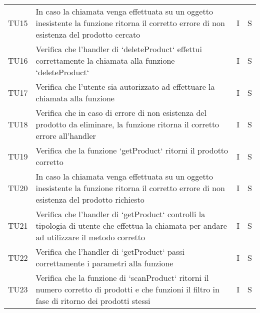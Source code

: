 \begin{center}
\begin{longtable}[!h]{p{45px} p{255px} p{35px} p{35px}}
        TU15          & In caso la chiamata venga effettuata su un oggetto inesistente la funzione ritorna il corretto errore di non esistenza del prodotto cercato                                                      & I              & S              \\
        TU16          & Verifica che l'handler di `deleteProduct` effettui correttamente la chiamata alla funzione `deleteProduct`                                                                                       & I              & S              \\
        TU17          & Verifica che l'utente sia autorizzato ad effettuare la chiamata alla funzione                                                                                                                    & I              & S              \\
        TU18          & Verifica che in caso di errore di non esistenza del prodotto da eliminare, la funzione ritorna il corretto errore all'handler                                                                    & I              & S              \\
        TU19          & Verifica che la funzione `getProduct` ritorni il prodotto corretto                                                                                                                               & I              & S              \\
        TU20          & In caso la chiamata venga effettuata su un oggetto inesistente la funzione ritorna il corretto errore di non esistenza del prodotto richiesto                                                    & I              & S              \\
        TU21          & Verifica che l'handler di `getProduct` controlli la tipologia di utente che effettua la chiamata per andare ad utilizzare il metodo corretto                                                     & I              & S              \\
        TU22          & Verifica che l'handler di `getProduct` passi correttamente i parametri alla funzione                                                                                                             & I              & S              \\
        TU23          & Verifica che la funzione di `scanProduct` ritorni il numero corretto di prodotti e che funzioni il filtro in fase di ritorno dei prodotti stessi                                                 & I              & S              \\

\end{longtable}
\end{center}
